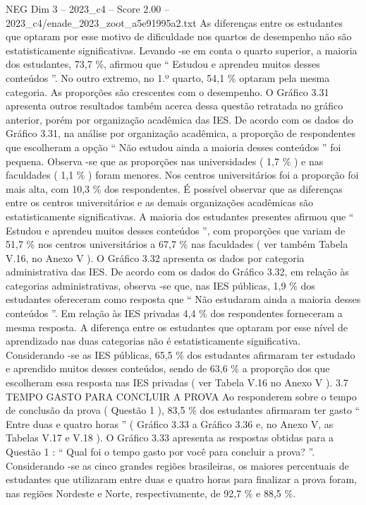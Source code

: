 \begin{textsample}{NEG Dim 3 – 2023\_c4 – Score 2.00 – 2023\_c4/enade\_2023\_zoot\_a5e91995a2.txt}
As diferenças entre os estudantes que optaram por esse motivo de dificuldade nos quartos de desempenho não são estatisticamente significativas.
Levando -se em conta o quarto superior, a maioria dos estudantes, 73,7 \%, afirmou que “ Estudou e aprendeu muitos desses conteúdos ”.
No outro extremo, no 1.º quarto, 54,1 \% optaram pela mesma categoria.
As proporções são crescentes com o desempenho.
O Gráfico 3.31 apresenta outros resultados também acerca dessa questão retratada no gráfico anterior, porém por organização acadêmica das IES.
De acordo com os dados do Gráfico 3.31, na análise por organização acadêmica, a proporção de respondentes que escolheram a opção “ Não estudou ainda a maioria desses conteúdos ” foi pequena.
Observa -se que as proporções nas universidades ( 1,7 \% ) e nas faculdades ( 1,1 \% ) foram menores.
Nos centros universitários foi a proporção foi mais alta, com 10,3 \% dos respondentes.
É possível observar que as diferenças entre os centros universitários e as demais organizações acadêmicas são estatisticamente significativas.
A maioria dos estudantes presentes afirmou que “ Estudou e aprendeu muitos desses conteúdos ”, com proporções que variam de 51,7 \% nos centros universitários a 67,7 \% nas faculdades ( ver também Tabela V.16, no Anexo V ).
O Gráfico 3.32 apresenta os dados por categoria administrativa das IES.
De acordo com os dados do Gráfico 3.32, em relação às categorias administrativas, observa -se que, nas IES públicas, 1,9 \% dos estudantes ofereceram como resposta que “ Não estudaram ainda a maioria desses conteúdos ”.
Em relação às IES privadas 4,4 \% dos respondentes forneceram a mesma resposta.
A diferença entre os estudantes que optaram por esse nível de aprendizado nas duas categorias não é estatisticamente significativa.
Considerando -se as IES públicas, 65,5 \% dos estudantes afirmaram ter estudado e aprendido muitos desses conteúdos, sendo de 63,6 \% a proporção dos que escolheram essa resposta nas IES privadas ( ver Tabela V.16 no Anexo V ). 3.7 TEMPO GASTO PARA CONCLUIR A PROVA Ao responderem sobre o tempo de conclusão da prova ( Questão 1 ), 83,5 \% dos estudantes afirmaram ter gasto “ Entre duas e quatro horas ” ( Gráfico 3.33 a Gráfico 3.36 e, no Anexo V, as Tabelas V.17 e V.18 ).
O Gráfico 3.33 apresenta as respostas obtidas para a Questão 1 : “ Qual foi o tempo gasto por você para concluir a prova? ”.
Considerando -se as cinco grandes regiões brasileiras, os maiores percentuais de estudantes que utilizaram entre duas e quatro horas para finalizar a prova foram, nas regiões Nordeste e Norte, respectivamente, de 92,7 \% e 88,5 \%.

\end{textsample}
